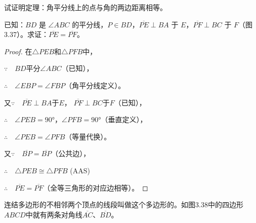 \begin{example}
    试证明定理：角平分线上的点与角的两边距离相等。

已知：$BD$ 是 $\angle ABC$ 的平分线，$P\in BD$，$\overline{PE}\perp BA$ 于 $E$，$\overline{PF}\perp BC$ 于 $F$（图3.37）。求证：$\overline{PE}=\overline{PF}$。
\end{example}

\begin{figure}
\begin{tikzpicture}
\end{tikzpicture}
    \caption{}
\end{figure}

\begin{proof}
在$\triangle PEB$和$\triangle PFB$中，

$\because\quad BD$平分$\angle ABC$（已知），

$\therefore\quad \angle EBP=\angle FBP$（角平分线定义）。

又$\because\quad \overline{PE}\perp BA$于$E$，
$\overline{PF}\perp BC$于$F$（已知），

$\therefore\quad \angle PEB=\ang{90}$，$\angle PFB=\ang{90}$（垂直定义），

$\therefore\quad \angle PEB=\angle PFB$（等量代换）。

又$\because\quad \overline{BP}=\overline{BP}$（公共边），

$\therefore\quad \triangle PEB\cong \triangle PFB$ (AAS)

$\therefore\quad \overline{PE}=\overline{PF}$（全等三角形的对应边相等）。
\end{proof}

\begin{Definition}
连结多边形的不相邻两个顶点的线段叫做这个多边形的。如图3.38中的四边形$ABCD$中就有两条对角线$\overline{AC}$、$\overline{BD}$。
\end{Definition}

